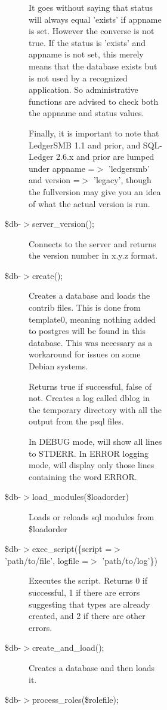 \begin{description}
\begin{description}
\begin{description}
\begin{description}
\begin{description}
\begin{description}
\begin{description}
It goes without saying that status will always equal 'exists' if appname is set.
However the converse is not true.  If the status is 'exists' and appname is not
set, this merely means that the database exists but is not used by a recognized
application.  So administrative functions are advised to check both the appname
and status values.



Finally, it is important to note that LedgerSMB 1.1 and prior, and SQL-Ledger 
2.6.x and prior are lumped under appname =$>$ 'ledgersmb' and version =$>$ 'legacy',
though the fullversion may give you an idea of what the actual version is run.


\item[{\$db-$>$server\_version();}] \mbox{}

Connects to the server and returns the version number in x.y.z format.


\item[{\$db-$>$create();}] \mbox{}

Creates a database and loads the contrib files.  This is done from template0, 
meaning nothing added to postgres will be found in this database.  This was 
necessary as a workaround for issues on some Debian systems.



Returns true if successful, false of not.  Creates a log called dblog in the 
temporary directory with all the output from the psql files.



In DEBUG mode, will show all lines to STDERR.  In ERROR logging mode, will 
display only those lines containing the word ERROR.


\item[{\$db-$>$load\_modules(\$loadorder)}] \mbox{}

Loads or reloads sql modules from \$loadorder


\item[{\$db-$>$exec\_script(\{script =$>$ 'path/to/file', logfile =$>$ 'path/to/log'\})}] \mbox{}

Executes the script.  Returns 0 if successful, 1 if there are errors suggesting
that types are already created, and 2 if there are other errors.


\item[{\$db-$>$create\_and\_load();}] \mbox{}

Creates a database and then loads it.


\item[{\$db-$>$process\_roles(\$rolefile);}] \mbox{}


\end{description}
\end{description}
\end{description}
\end{description}
\end{description}
\end{description}
\end{description}
